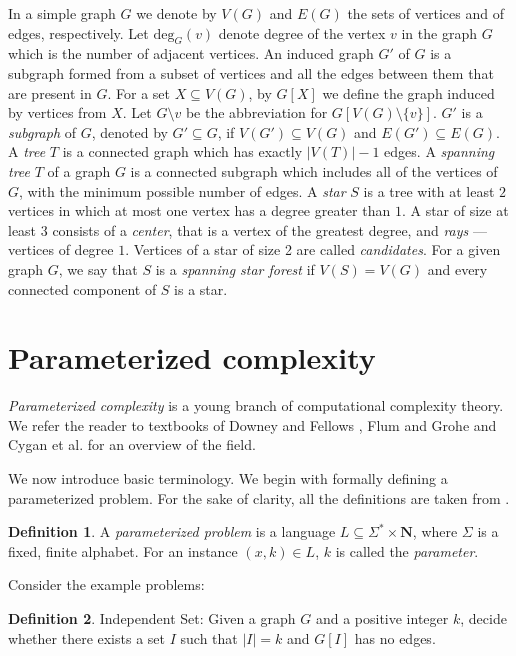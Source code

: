 \documentclass[en]{pracamgr}
\theoremstyle{definition}
\newtheorem{definition}{Definition}
\newcommand{\ssf}{spanning star forest}
\newcommand{\indset}{{\sc Independent Set}}
\newcommand{\degree}[2]{\textrm{deg}_{#1}(#2)}
\begin{document}
In a simple graph $G$ we denote by $V(G)$ and $E(G)$ the sets of vertices and of edges, respectively. 
Let $\degree{G}{v}$ denote degree of the vertex $v$ in the graph $G$ which is the number of adjacent vertices. 
An induced graph $G'$ of $G$ is a subgraph formed from a subset of vertices and all the edges between them that are present in $G$. 
For a set $X \subseteq V(G)$, by $G[X]$ we define the graph induced by vertices from $X$. 
Let $G \setminus v$ be the abbreviation for $G[V(G) \setminus \{v\}]$.
$G'$ is a \emph{subgraph} of $G$, denoted by $G' \subseteq G$, if $V(G') \subseteq V(G)$ and $E(G') \subseteq E(G)$.
A \emph{tree} $T$ is a connected graph which has exactly $|V(T)|-1$ edges. 
A \emph{spanning tree} $T$ of a graph $G$ is a connected subgraph which includes all of the vertices of $G$, with the minimum possible number of edges.
A \emph{star} $S$ is a tree with at least $2$ vertices in which at most one vertex has a degree greater than $1$. 
A star of size at least $3$ consists of a \emph{center}, that is a vertex of the greatest degree, and \emph{rays} --- vertices of degree $1$. 
Vertices of a star of size 2 are called \emph{candidates}.
For a given graph $G$, we say that $S$ is a \emph{\ssf{}} if $V(S)=V(G)$ and every connected component of $S$ is a star.

\section{Parameterized complexity}

\emph{Parameterized complexity} is a young branch of computational complexity theory. We refer the reader to textbooks of Downey and Fellows \cite{ParComp}, Flum and Grohe \cite{ParCompThm} and Cygan et al. \cite{ParAlg} for an overview of the field.

We now introduce basic terminology. We begin with formally defining a parameterized problem. For the sake of clarity, all the definitions are taken from \cite{ParAlg}.

\begin{definition}\label{Parameterized problem}
	A \textit{parameterized problem} is a language $L \subseteq \Sigma^* \times \mathbf{N}$, where $\Sigma$ is a fixed, finite alphabet. For an instance $(x,k) \in L$, $k$ is called the \textit{parameter}.
\end{definition}

\noindent
Consider the example problems:

\begin{definition}
	\indset{}: Given a graph $G$ and a positive integer $k$, decide whether there exists a set $I$ such that $|I|=k$ and $G[I]$ has no edges.
\end{definition}
\end{document}
